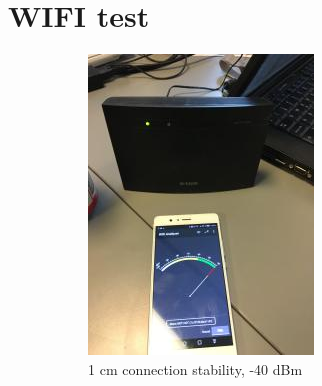 \section{WIFI test}
\begin{figure}[h]
\centering
    \begin{subfigure}{.49\textwidth}
        \centering
        \includegraphics[width=\textwidth]{figures/image.jpg}
        \caption{1 cm connection stability, -40 dBm}
        \label{fig:wifitest1} 
    \end{subfigure}
    \begin{subfigure}{.49\textwidth}
        \centering

\end{subfigure}
\end{figure}
